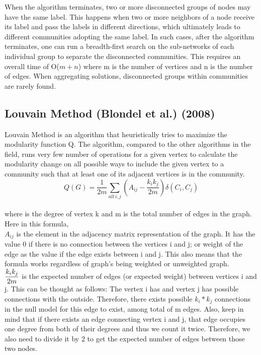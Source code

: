 \documentclass[10pt]{article}
\begin{document}
When the algorithm terminates, two or more disconnected groups of nodes may have the same label. This happens when two or more neighbors of a node receive its label and pass the labels in different directions, which ultimately leads to different communities adopting the same label. In such cases, after the algorithm terminates, one can run a breadth-first search on the sub-networks of each individual group to separate the disconnected communities. This requires an overall time of O($m+n$) where m is the number of vertices and n is the number of edges. When aggregating solutions, disconnected groups within communities are rarely found. \\

\subsection{Louvain Method (Blondel et al.) (2008)}

Louvain Method is an algorithm that heuristically tries to maximize the modularity function Q. The algorithm, compared to the other algorithms in the field, runs very few number of operations for a given vertex to calculate the modularity change on all possible ways to include the given vertex to a community such that at least one of its adjacent vertices is in the community. \\

\[ Q\left(G\right) = \frac{1}{2m}  \sum_{all\ i,j} \left( A_{ij} - \frac{k_i k_j}{2m} \right)  \delta \left( C_i, C_j\right) \] \\

where is the degree of vertex k and m is the total number of edges in the graph. Here in this formula, \\

$A_{ij}$ is the element in the adjacency matrix representation of the graph. It has the value 0 if there is no connection between the vertices i and j; or weight of the edge as the value if the edge exists between i and j. This also means that the formula works regardless of graph’s being weighted or unweighted graph. \\

$ \mathlarger{ \frac{k_i k_j}{2m} } $ is the expected number of edges (or expected weight) between vertices i and j. This can be thought as follows: The vertex i has and vertex j has possible connections with the outside. Therefore, there exists possible $k_i * k_j$ connections in the null model for this edge to exist, among total of m edges. Also, keep in mind that if there exists an edge connecting vertex i and j, that edge occupies one degree from both of their degrees and thus we count it twice. Therefore, we also need to divide it by 2 to get the expected number of edges between those two nodes. \\
\end{document}
